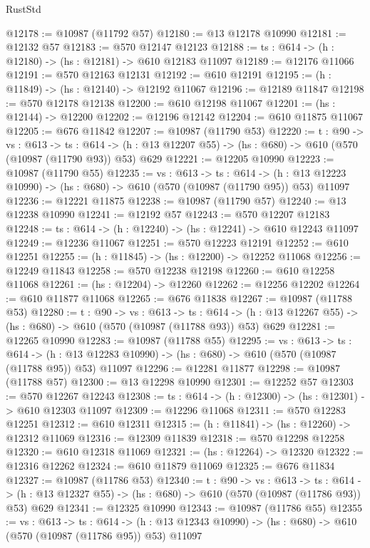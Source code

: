 \begin{lexlean}{RustStd}
\begin{coremodule}
@12178 := @10987 (@11792 @57)
@12180 := @13 @12178 @10990
@12181 := @12132 @57
@12183 := @570 @12147 @12123
@12188 := {ts : @614} -> (h : @12180) -> (hs : @12181) -> @610 @12183 @11097
@12189 := @12176 @11066
@12191 := @570 @12163 @12131
@12192 := @610 @12191
@12195 := (h : @11849) -> (hs : @12140) -> @12192 @11067
@12196 := @12189 @11847
@12198 := @570 @12178 @12138
@12200 := @610 @12198 @11067
@12201 := (hs : @12144) -> @12200
@12202 := @12196 @12142
@12204 := @610 @11875 @11067
@12205 := @676 @11842
@12207 := @10987 (@11790 @53)
@12220 := {t : @90} ->
  {vs : @613} ->
  {ts : @614} -> (h : @13 @12207 @55) -> (hs : @680) -> @610 (@570 (@10987 (@11790 @93)) @53) @629
@12221 := @12205 @10990
@12223 := @10987 (@11790 @55)
@12235 := {vs : @613} ->
  {ts : @614} ->
  (h : @13 @12223 @10990) -> (hs : @680) -> @610 (@570 (@10987 (@11790 @95)) @53) @11097
@12236 := @12221 @11875
@12238 := @10987 (@11790 @57)
@12240 := @13 @12238 @10990
@12241 := @12192 @57
@12243 := @570 @12207 @12183
@12248 := {ts : @614} -> (h : @12240) -> (hs : @12241) -> @610 @12243 @11097
@12249 := @12236 @11067
@12251 := @570 @12223 @12191
@12252 := @610 @12251
@12255 := (h : @11845) -> (hs : @12200) -> @12252 @11068
@12256 := @12249 @11843
@12258 := @570 @12238 @12198
@12260 := @610 @12258 @11068
@12261 := (hs : @12204) -> @12260
@12262 := @12256 @12202
@12264 := @610 @11877 @11068
@12265 := @676 @11838
@12267 := @10987 (@11788 @53)
@12280 := {t : @90} ->
  {vs : @613} ->
  {ts : @614} -> (h : @13 @12267 @55) -> (hs : @680) -> @610 (@570 (@10987 (@11788 @93)) @53) @629
@12281 := @12265 @10990
@12283 := @10987 (@11788 @55)
@12295 := {vs : @613} ->
  {ts : @614} ->
  (h : @13 @12283 @10990) -> (hs : @680) -> @610 (@570 (@10987 (@11788 @95)) @53) @11097
@12296 := @12281 @11877
@12298 := @10987 (@11788 @57)
@12300 := @13 @12298 @10990
@12301 := @12252 @57
@12303 := @570 @12267 @12243
@12308 := {ts : @614} -> (h : @12300) -> (hs : @12301) -> @610 @12303 @11097
@12309 := @12296 @11068
@12311 := @570 @12283 @12251
@12312 := @610 @12311
@12315 := (h : @11841) -> (hs : @12260) -> @12312 @11069
@12316 := @12309 @11839
@12318 := @570 @12298 @12258
@12320 := @610 @12318 @11069
@12321 := (hs : @12264) -> @12320
@12322 := @12316 @12262
@12324 := @610 @11879 @11069
@12325 := @676 @11834
@12327 := @10987 (@11786 @53)
@12340 := {t : @90} ->
  {vs : @613} ->
  {ts : @614} -> (h : @13 @12327 @55) -> (hs : @680) -> @610 (@570 (@10987 (@11786 @93)) @53) @629
@12341 := @12325 @10990
@12343 := @10987 (@11786 @55)
@12355 := {vs : @613} ->
  {ts : @614} ->
  (h : @13 @12343 @10990) -> (hs : @680) -> @610 (@570 (@10987 (@11786 @95)) @53) @11097

\end{coremodule}
\end{lexlean}

